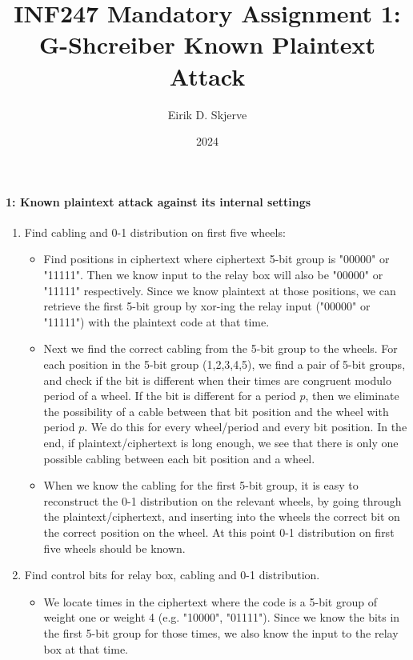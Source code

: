 \documentclass{article}
\title{INF247 Mandatory Assignment 1: G-Shcreiber Known Plaintext Attack}
\author{Eirik D. Skjerve}
\date{2024}
\begin{document}
\maketitle
\paragraph{1: Known plaintext attack against its internal settings}
\begin{enumerate}
    \item Find cabling and 0-1 distribution on first five wheels:
    \begin{itemize}
        \item Find positions in ciphertext where ciphertext 5-bit group
        is "00000" or "11111". Then we know input to the relay box will also be "00000" or "11111" respectively.
        Since we know plaintext at those positions, we can retrieve the first 5-bit group by xor-ing 
        the relay input ("00000" or "11111") with the plaintext code at that time.
        \item Next we find the correct cabling from the 5-bit group to the wheels.
        For each position in the 5-bit group (1,2,3,4,5), we find a pair of 5-bit groups, and check
        if the bit is different when their times are congruent modulo period of a wheel.
        If the bit is different for a period $p$, then we eliminate the possibility of a cable
        between that bit position and the wheel with period $p$. We do this for every wheel/period and every bit position.
        In the end, if plaintext/ciphertext is long enough, we see that there is only one possible cabling between each
        bit position and a wheel. 
        \item When we know the cabling for the first 5-bit group, it is easy to reconstruct the 0-1 distribution on the relevant wheels,
        by going through the plaintext/ciphertext, and inserting into the wheels the correct bit on the correct position on the wheel.
        At this point 0-1 distribution on first five wheels should be known.
    \end{itemize}
    \item Find control bits for relay box, cabling and 0-1 distribution.
    \begin{itemize}
        \item We locate times in the ciphertext where the code is a 5-bit group of weight one or weight 4 (e.g. "10000", "01111").
        Since we know the bits in the first 5-bit group for those times, we also know the input to the relay box at that time.

\end{itemize}
\end{enumerate}
\end{document}
